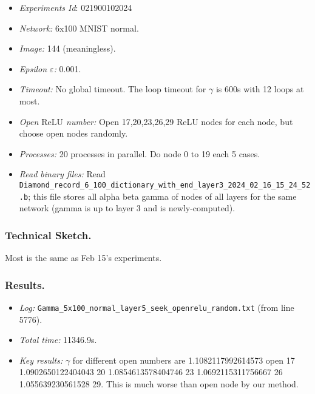 \documentclass{llncs}
\newcommand{\ReLU}{\mathrm{ReLU}}
\begin{document}
\begin{itemize}
	\item\emph{Experiments Id}: 021900102024
	
	\item\emph{Network:} 6x100 MNIST normal. 
	
	\item\emph{Image:} 144 (meaningless).
	
	\item\emph{Epsilon $\varepsilon$:} 0.001.
	
	\item\emph{Timeout:} No global timeout. The loop timeout for $\gamma$ is 600s with 12 loops at most.
	
	\item\emph{Open $\ReLU$ number:} Open 17,20,23,26,29 ReLU nodes for each node, but choose open nodes randomly.
	
	\item\emph{Processes:} 20 processes in parallel. Do node 0 to 19 each 5 cases.
	
	\item\emph{Read binary files:} Read \verb*|Diamond_record_6_100_dictionary_with_end_layer3_2024_02_16_15_24_52.b|; this file stores all alpha beta gamma of nodes of all layers for the same network (gamma is up to layer 3 and is newly-computed). 
\end{itemize}


\subsubsection*{Technical Sketch.}

Most is the same as Feb 15's experiments.

\subsubsection*{Results.}

\begin{itemize}
	\item \emph{Log:} \verb*|Gamma_5x100_normal_layer5_seek_openrelu_random.txt| (from line 5776).
	
	\item \emph{Total time:} 11346.9s.
	
	\item \emph{Key results:} $\gamma$ for different open numbers are 1.1082117992614573    open 17
	1.0902650122404043     20
	1.0854613578404746     23
	1.0692115311756667     26
	1.055639230561528        29. This is much worse than open node by our method.
	
\end{itemize}
\end{document}
